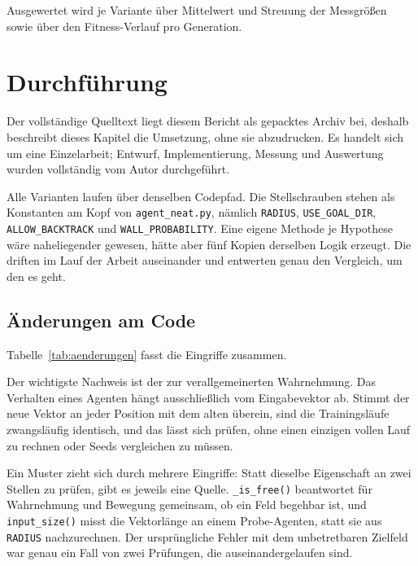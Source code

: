 \documentclass[sigconf]{acmart}
\begin{document}
Ausgewertet wird je Variante über Mittelwert und Streuung der Messgrößen sowie über den Fitness-Verlauf pro Generation.


\section{Durchführung}
\label{sec:durchfuehrung}
Der vollständige Quelltext liegt diesem Bericht als gepacktes Archiv bei, deshalb beschreibt dieses Kapitel die Umsetzung, ohne sie abzudrucken. Es handelt sich um eine Einzelarbeit; Entwurf, Implementierung, Messung und Auswertung wurden vollständig vom Autor durchgeführt.

Alle Varianten laufen über denselben Codepfad. Die Stellschrauben stehen als Konstanten am Kopf von \texttt{agent\_neat.py}, nämlich \texttt{RADIUS}, \texttt{USE\_GOAL\_DIR}, \texttt{ALLOW\_BACK\allowbreak TRACK} und \texttt{WALL\_PROBABILITY}. Eine eigene Methode je Hypothese wäre naheliegender gewesen, hätte aber fünf Kopien derselben Logik erzeugt. Die driften im Lauf der Arbeit auseinander und entwerten genau den Vergleich, um den es geht.

\subsection{Änderungen am Code}
Tabelle~\ref{tab:aenderungen} fasst die Eingriffe zusammen.

Der wichtigste Nachweis ist der zur verallgemeinerten Wahrnehmung. Das Verhalten eines Agenten hängt ausschließlich vom Eingabevektor ab. Stimmt der neue Vektor an jeder Position mit dem alten überein, sind die Trainingsläufe zwangsläufig identisch, und das lässt sich prüfen, ohne einen einzigen vollen Lauf zu rechnen oder Seeds vergleichen zu müssen.

Ein Muster zieht sich durch mehrere Eingriffe: Statt dieselbe Eigenschaft an zwei Stellen zu prüfen, gibt es jeweils eine Quelle. \texttt{\_is\_free()} beantwortet für Wahrnehmung und Bewegung gemeinsam, ob ein Feld begehbar ist, und \texttt{input\_size()} misst die Vektorlänge an einem Probe-Agenten, statt sie aus \texttt{RADIUS} nachzurechnen. Der ursprüngliche Fehler mit dem unbetretbaren Zielfeld war genau ein Fall von zwei Prüfungen, die auseinandergelaufen sind.
\end{document}
